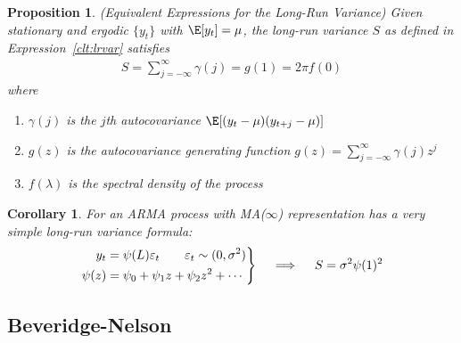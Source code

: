 \documentclass[12pt]{article}
\theoremstyle{plain}
\newtheorem{prop}[thm]{Proposition}
\newtheorem{cor}[thm]{Corollary}
\theoremstyle{definition}
\theoremstyle{remark}
\newenvironment{rcases}
  {\left.\begin{aligned}}
  {\end{aligned}\right\rbrace}
\begin{document}
\begin{prop}
\emph{(Equivalent Expressions for the Long-Run Variance)}
Given stationary and ergodic $\{y_t\}$ with $\E[y_t]=\mu$, the long-run
variance $S$ as defined in Expression~\ref{clt:lrvar} satisfies
\begin{align*}
  S = \sum_{j=-\infty}^\infty \gamma(j) = g(1) = 2\pi f(0)
\end{align*}
where
\begin{enumerate}[label=(\roman*)]
  \item $\gamma(j)$ is the $j$th autocovariance
    $\E[(y_t-\mu)(y_{t+j}-\mu)]$
  \item $g(z)$ is the autocovariance generating function
    $g(z)=\sum_{j=-\infty}^\infty \gamma(j)z^j$
  \item $f(\lambda)$ is the spectral density of the process
\end{enumerate}
\end{prop}

\begin{cor}
For an ARMA process with MA($\infty$) representation has a very simple
long-run variance formula:
\begin{align*}
  \begin{rcases}
  y_t &= \psi(L)\varepsilon_t
  \qquad \varepsilon_t \sim (0,\sigma^2) \\
  \psi(z) &= \psi_0 + \psi_1z + \psi_2z^2 + \cdots
  \end{rcases}
  \quad\implies\quad
  S = \sigma^2 \psi(1)^2
\end{align*}
\end{cor}

\clearpage
\subsection{Beveridge-Nelson}
\end{document}
